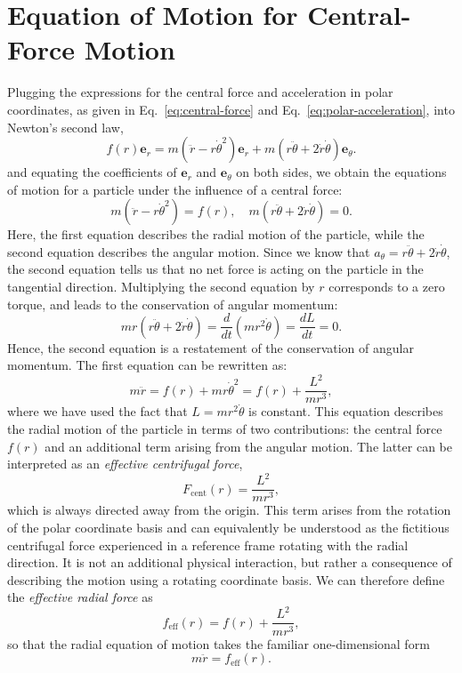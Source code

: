 \documentclass[12pt]{article}
\begin{document}
\section{Equation of Motion for Central-Force Motion}

Plugging the expressions for the central force and acceleration in polar coordinates, as given in Eq.~\ref{eq:central-force} and Eq.~\ref{eq:polar-acceleration}, into Newton's second law,
\[
f(r)\mathbf{e}_r = m (\ddot{r} - r\dot{\theta}^2)\mathbf{e}_r + m(r\ddot{\theta} + 2\dot{r}\dot{\theta})\mathbf{e}_\theta.
\]
and equating the coefficients of $\mathbf{e}_r$ and $\mathbf{e}_\theta$ on both sides, we obtain the equations of motion for a particle under the influence of a central force:
\begin{equation}
    m(\ddot{r} - r\dot{\theta}^2) = f(r), \quad
    m(r\ddot{\theta} + 2\dot{r}\dot{\theta}) = 0.
    \label{eq:central-force-motion}
\end{equation}
Here, the first equation describes the radial motion of the particle, while the second equation describes the angular motion. Since we know that $a_\theta = r\ddot{\theta} + 2\dot{r}\dot{\theta}$, the second equation tells us that no net force is acting on the particle in the tangential direction. Multiplying the second equation by $r$ corresponds to a zero torque, and leads to the conservation of angular momentum:
\[
mr(r\ddot{\theta} + 2\dot{r}\dot{\theta}) = \frac{d}{dt}(mr^2\dot{\theta}) = \frac{dL}{dt} = 0.
\]
Hence, the second equation is a restatement of the conservation of angular momentum. The first equation can be rewritten as:
\[
m\ddot{r} = f(r) + mr\dot{\theta}^2 = f(r) + \frac{L^2}{mr^3},
\]
where we have used the fact that $L = mr^2\dot{\theta}$ is constant. This equation describes the radial
motion of the particle in terms of two contributions: the
central force $f(r)$ and an additional term arising from
the angular motion. The latter can be interpreted as an
\textit{effective centrifugal force},
\[
    F_{\mathrm{cent}}(r) = \frac{L^2}{mr^3},
\]
which is always directed away from the origin. This term arises from the rotation of the polar
coordinate basis and can equivalently be understood
as the fictitious centrifugal force experienced in
a reference frame rotating with the radial direction.
It is not an additional physical interaction, but
rather a consequence of describing the motion using
a rotating coordinate basis. We can therefore define the \textit{effective radial force}
as
\begin{equation}
    f_{\mathrm{eff}}(r)
    = f(r) + \frac{L^2}{mr^3},
    \label{eq:effective-radial-force}
\end{equation}
so that the radial equation of motion takes the familiar
one-dimensional form
\[
    m\ddot{r} = f_{\mathrm{eff}}(r).
\]
\end{document}
